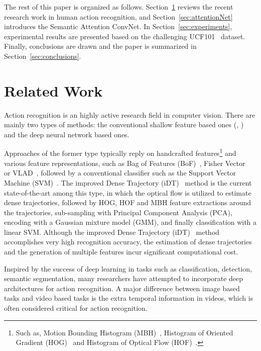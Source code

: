 \documentclass[10pt,twocolumn,letterpaper]{article}
\begin{document}
%
The rest of this paper is organized as follows. Section~\ref{sec:related} reviews the recent research work in human action recognition, and Section~\ref{sec:attentionNet} introduces the Semantic 
Attention ConvNet. In Section~\ref{sec:experiments}, experimental results are presented based on the challenging UCF101~\cite{soomro2012ucf101} dataset. Finally, conclusions are drawn and the paper is summarized in Section~\ref{sec:conclusions}.
%
\section{Related Work}\label{sec:related}
%
Action recognition is an highly active research field in computer vision. There are mainly two types of methods: the conventional shallow feature based ones (\eg, \cite{wang2011action, wang2013action, dalal2006human}) and the deep neural network based ones. 

%
Approaches of the former type typically reply on handcrafted features\footnote{Such as, Motion Bounding Histogram (MBH)~\cite{dalal2006human}, Histogram of Oriented Gradient (HOG)~\cite{dalal2005histograms} and Histogram of Optical Flow (HOF)~\cite{chaudhry2009histograms}.} and various feature representations, such as Bag of Features (BoF)~\cite{nowak2006sampling}, Fisher Vector~\cite{perronnin2010improving} or VLAD~\cite{jegou2010aggregating}, followed by a conventional classifier such as the Support Vector Machine (SVM)~\cite{cortes1995support}. The improved Dense Trajectory (iDT)~\cite{wang2013action} method is the current state-of-the-art among this type, in which the optical flow is utilized to estimate dense trajectories, followed by HOG, HOF and MBH feature extractions around the trajectories, sub-sampling with Principal Component Analysis (PCA), encoding with a Gaussian mixture model (GMM), and finally classification with a linear SVM. Although the improved Dense Trajectory (iDT)~\cite{wang2013action} method accomplishes very high recognition accuracy, the estimation of dense trajectories and the generation of multiple features incur significant computational cost. 


%
Inspired by the success of deep learning in tasks such as classification, detection, semantic segmentation, many researchers have attempted to incorporate deep architectures for action recognition. A major difference between image based tasks and video based tasks is the extra temporal information in videos, which is often considered critical for action recognition. 
\end{document}
